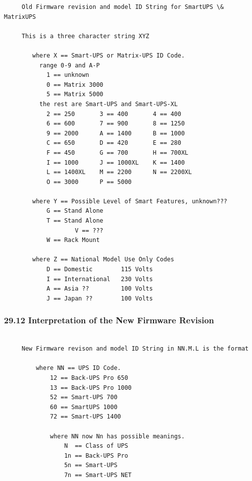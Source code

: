 {{{{{{{{{{{{{{{{{\begin{verbatim}
     Old Firmware revision and model ID String for SmartUPS \& MatrixUPS
     
     This is a three character string XYZ
     
        where X == Smart-UPS or Matrix-UPS ID Code.
          range 0-9 and A-P
            1 == unknown
            0 == Matrix 3000
            5 == Matrix 5000
          the rest are Smart-UPS and Smart-UPS-XL
            2 == 250       3 == 400       4 == 400
            6 == 600       7 == 900       8 == 1250
            9 == 2000      A == 1400      B == 1000
            C == 650       D == 420       E == 280
            F == 450       G == 700       H == 700XL
            I == 1000      J == 1000XL    K == 1400
            L == 1400XL    M == 2200      N == 2200XL
            O == 3000      P == 5000
     
        where Y == Possible Level of Smart Features, unknown???
            G == Stand Alone
            T == Stand Alone
                    V == ???
            W == Rack Mount
     
        where Z == National Model Use Only Codes
            D == Domestic        115 Volts
            I == International   230 Volts
            A == Asia ??         100 Volts
            J == Japan ??        100 Volts
\end{verbatim}
\normalsize

\label{Interpretation-of-the-New-Firmware-Revision}

\subsubsection*{29.12 Interpretation of the New Firmware Revision}

\footnotesize
\begin{verbatim}
     
     New Firmware revison and model ID String in NN.M.L is the format
     
         where NN == UPS ID Code.
             12 == Back-UPS Pro 650
             13 == Back-UPS Pro 1000
             52 == Smart-UPS 700
             60 == SmartUPS 1000
             72 == Smart-UPS 1400
     
             where NN now Nn has possible meanings.
                 N  == Class of UPS
                 1n == Back-UPS Pro
                 5n == Smart-UPS
                 7n == Smart-UPS NET
     

\end{verbatim}}}}}}}}}}}}}}}}}}
